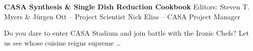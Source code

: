 \pagestyle{empty}

\begin{center}
\Huge
{\bf CASA Synthesis \& Single Dish Reduction Cookbook} 
\break 
\break 
\break 
\break 
\Large
{Editors: Steven T. Myers \& J\"urgen Ott -- Project Scientist}
%
\break 
{Nick Elias -- CASA Project Manager}
\end{center}
\normalsize
\vspace{4cm}

\begin{center}
\Large
{Do you dare to enter CASA Stadium and join battle with the Ironic Chefs?
\break 
Let us see whose cuisine reigns supreme \ldots}
\end{center}
\vfill


